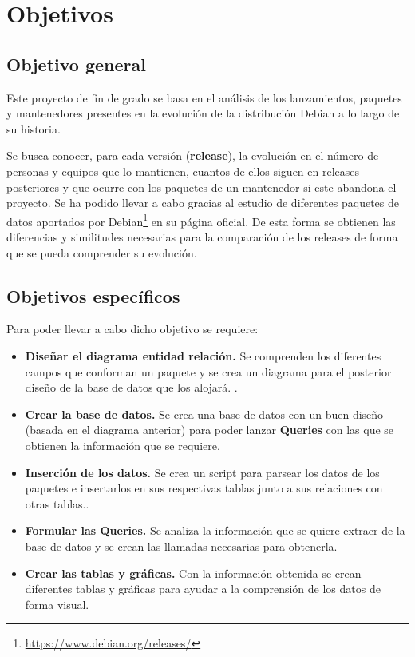 \documentclass[a4paper, 12pt]{book}
\begin{document}
\cleardoublepage %
\chapter{Objetivos} %
\label{chap:objetivos} %



\section{Objetivo general} %
\label{sec:objetivo-general} %

Este proyecto de fin de grado se basa en el análisis de los lanzamientos, paquetes y mantenedores presentes en la evolución de la distribución Debian a lo largo de su historia. 

Se busca conocer, para cada versión (\textbf{release}), la evolución en el número de personas y equipos que lo mantienen,  cuantos de ellos siguen en releases posteriores y que ocurre con los paquetes de un mantenedor si este abandona el proyecto. Se ha podido llevar a cabo gracias al estudio de diferentes paquetes de datos aportados por Debian\footnote{\url{https://www.debian.org/releases/}} en su página oficial.
De esta forma se obtienen las diferencias y similitudes necesarias para la comparación de los releases de forma que se pueda comprender su evolución.


\section{Objetivos específicos}
\label{sec:objetivos-especificos}

Para poder llevar a cabo dicho objetivo se requiere: 

\begin{itemize}
	\item \textbf {Diseñar el diagrama entidad relación.} Se comprenden los diferentes campos que conforman un paquete y se crea un diagrama para el posterior diseño de la base de datos que los alojará.
	.
	\item \textbf {Crear la base de datos.} Se crea una base de datos con un buen diseño (basada en el diagrama anterior) para poder lanzar \textbf {Queries} con las que se obtienen la información que se requiere.
	
	\item \textbf {Inserción de los datos.} Se crea un script para parsear los datos de los paquetes e insertarlos en sus respectivas tablas junto a sus relaciones con otras tablas..
	
	\item \textbf {Formular las Queries.} Se analiza la información que se quiere extraer de la base de datos y se crean las llamadas necesarias para obtenerla.
	
	
	\item \textbf {Crear las tablas y gráficas.} Con la información obtenida se crean diferentes tablas y gráficas para ayudar a la comprensión de los datos de forma visual.
\end{itemize}
\end{document}
